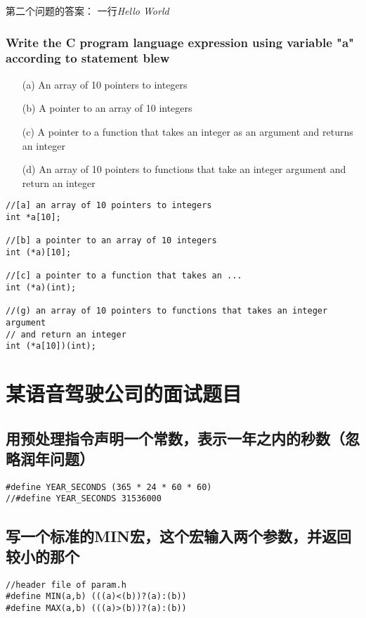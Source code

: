 \documentclass{article}
\begin{document}
第二个问题的答案： 一行\textit{Hello World}

\subsubsection{Write the C program language expression using variable "a" according to statement blew}
\begin{itemize}
\item[(a)] An array of 10 pointers to integers
\item[(b)] A pointer to an array of 10 integers
\item[(c)] A pointer to a function that takes an integer as an argument and returns an integer
\item[(d)] An array of 10 pointers to functions that take an integer argument and return an integer
\end{itemize}
\begin{verbatim}
//[a] an array of 10 pointers to integers
int *a[10];

//[b] a pointer to an array of 10 integers
int (*a)[10];

//[c] a pointer to a function that takes an ...
int (*a)(int);

//(g) an array of 10 pointers to functions that takes an integer argument
// and return an integer
int (*a[10])(int);
\end{verbatim}

\section{某语音驾驶公司的面试题目}
\subsection{用预处理指令声明一个常数，表示一年之内的秒数（忽略润年问题）}
\begin{verbatim}
#define YEAR_SECONDS (365 * 24 * 60 * 60)
//#define YEAR_SECONDS 31536000
\end{verbatim}

\subsection{写一个标准的MIN宏，这个宏输入两个参数，并返回较小的那个}
\begin{verbatim}
//header file of param.h
#define MIN(a,b) (((a)<(b))?(a):(b))
#define MAX(a,b) (((a)>(b))?(a):(b))

\end{verbatim}
\end{document}
